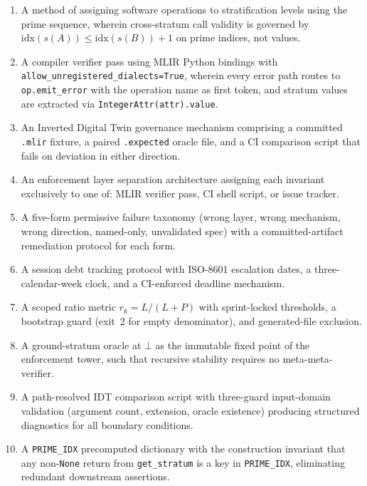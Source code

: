 \documentclass[11pt,letterpaper]{article}
\theoremstyle{pirtmthm}
\theoremstyle{remark}
\begin{document}
\begin{enumerate}[leftmargin=1.8em,label=\textbf{Claim \arabic*.},itemsep=4pt]
  \item A method of assigning software operations to stratification levels using
    the prime sequence, wherein cross-stratum call validity is governed by
    $\mathrm{idx}(s(A)) \leq \mathrm{idx}(s(B)) + 1$ on prime indices, not values.

  \item A compiler verifier pass using MLIR Python bindings with
    \texttt{allow\_unregistered\_dialects=True}, wherein every error path
    routes to \texttt{op.emit\_error} with the operation name as first token,
    and stratum values are extracted via \texttt{IntegerAttr(attr).value}.

  \item An Inverted Digital Twin governance mechanism comprising a committed
    \texttt{.mlir} fixture, a paired \texttt{.expected} oracle file, and a CI
    comparison script that fails on deviation in either direction.

  \item An enforcement layer separation architecture assigning each invariant
    exclusively to one of: MLIR verifier pass, CI shell script, or issue tracker.

  \item A five-form permissive failure taxonomy (wrong layer, wrong mechanism,
    wrong direction, named-only, unvalidated spec) with a committed-artifact
    remediation protocol for each form.

  \item A session debt tracking protocol with ISO-8601 escalation dates,
    a three-calendar-week clock, and a CI-enforced deadline mechanism.

  \item A scoped ratio metric $r_k = L/(L+P)$ with sprint-locked thresholds,
    a bootstrap guard (exit~2 for empty denominator), and generated-file exclusion.

  \item A ground-stratum oracle at $\bot$ as the immutable fixed point of the
    enforcement tower, such that recursive stability requires no meta-meta-verifier.

  \item A path-resolved IDT comparison script with three-guard input-domain
    validation (argument count, extension, oracle existence) producing structured
    diagnostics for all boundary conditions.

  \item A \texttt{PRIME\_IDX} precomputed dictionary with the construction
    invariant that any non-\texttt{None} return from \texttt{get\_stratum}
    is a key in \texttt{PRIME\_IDX}, eliminating redundant downstream assertions.
\end{enumerate}
\end{document}
